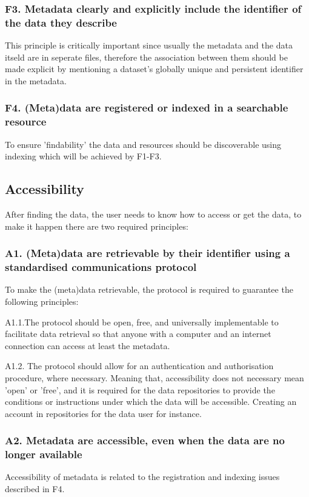 \subsubsection*{F3. Metadata clearly and explicitly include the identifier of the data they describe}
This principle is critically important since usually the metadata and the data itseld are in seperate files, therefore the association between them should be made explicit by mentioning a dataset’s globally unique and persistent identifier in the metadata. 
\subsubsection*{F4. (Meta)data are registered or indexed in a searchable resource}
To ensure 'findability' the data and resources should be discoverable using indexing which will be achieved by F1-F3.

\subsection*{Accessibility}
After finding the data, the user needs to know how to access or get the data, to make it happen there are two required principles:

\subsubsection*{A1. (Meta)data are retrievable by their identifier using a standardised communications protocol}
To make the (meta)data retrievable, the protocol is required to guarantee the following principles: 

\quad A1.1.The protocol should be open, free, and universally implementable to facilitate data retrieval so that anyone with a computer and an internet connection can access at least the metadata.

\quad A1.2. The protocol should allow for an authentication and authorisation procedure, where necessary. Meaning that, accessibility does not necessary mean 'open' or 'free', and it is required for the data repositories to provide the conditions or instructions under which the data will be accessible. Creating an account in repositories for the data user for instance.

\subsubsection*{A2. Metadata are accessible, even when the data are no longer available}  Accessibility of metadata is related to the registration and indexing issues described in F4. 


